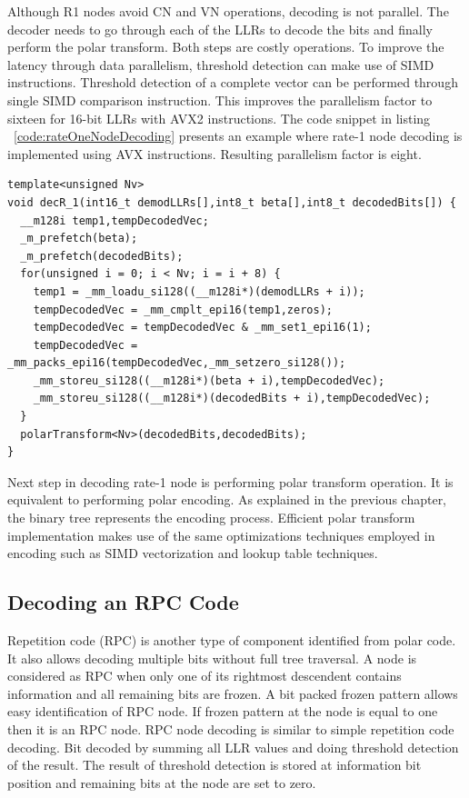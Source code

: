 Although R1 nodes avoid CN and VN operations, decoding is not parallel. The decoder needs to go through each of the LLRs to decode the bits and finally perform the polar transform. Both steps are costly operations. To improve the latency through data parallelism, threshold detection can make use of SIMD instructions. Threshold detection of a complete vector can be performed through single SIMD comparison instruction. This improves the parallelism factor to sixteen for 16-bit LLRs with {AVX2} instructions. The code snippet in listing ~\ref{code:rateOneNodeDecoding} presents an example where rate-1 node decoding is implemented using AVX instructions. Resulting parallelism factor is eight. \newline
  \\
\begin{code}
	\label{code:rateOneNodeDecoding}
	\begin{verbatim}
template<unsigned Nv>
void decR_1(int16_t demodLLRs[],int8_t beta[],int8_t decodedBits[]) {
  __m128i temp1,tempDecodedVec;
  _m_prefetch(beta);
  _m_prefetch(decodedBits);
  for(unsigned i = 0; i < Nv; i = i + 8) {
    temp1 = _mm_loadu_si128((__m128i*)(demodLLRs + i));
    tempDecodedVec = _mm_cmplt_epi16(temp1,zeros);
    tempDecodedVec = tempDecodedVec & _mm_set1_epi16(1);
    tempDecodedVec = _mm_packs_epi16(tempDecodedVec,_mm_setzero_si128());
    _mm_storeu_si128((__m128i*)(beta + i),tempDecodedVec);
    _mm_storeu_si128((__m128i*)(decodedBits + i),tempDecodedVec);
  }
  polarTransform<Nv>(decodedBits,decodedBits);
}
\end{verbatim}
\end{code}

Next step in decoding rate-1 node is performing polar transform operation. It is equivalent to performing polar encoding. As explained in the previous chapter, the binary tree represents the encoding process. Efficient polar transform implementation makes use of the same optimizations techniques employed in encoding such as SIMD vectorization and lookup table techniques.

\subsection{Decoding an RPC Code}
Repetition code (RPC) is another type of component identified from polar code. It also allows decoding multiple bits without full tree traversal. A node is considered as RPC when only one of its rightmost descendent contains information and all remaining bits are frozen. A bit packed frozen pattern allows easy identification of RPC node. If frozen pattern at the node is equal to one then it is an RPC node. RPC node decoding is similar to simple repetition code decoding. Bit decoded by summing all LLR values and doing threshold detection of the result.  The result of threshold detection is stored at information bit position and remaining bits at the node are set to zero.

